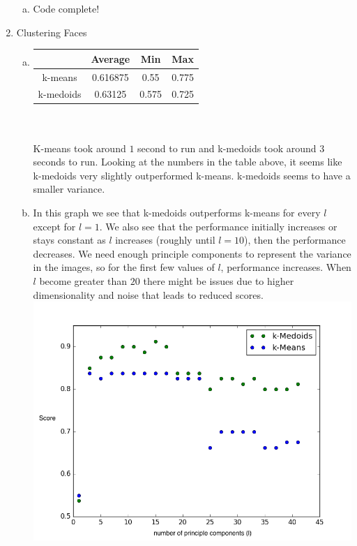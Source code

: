 \documentclass[11pt]{article}
\begin{document}
\begin{enumerate}[1]
\begin{enumerate}[(a)]
\item Code complete!
\end{enumerate}
\item Clustering Faces
\begin{enumerate}[(a)]
\item \begin{tabular}{| c | c | c | c |}
  \hline		
   & Average & Min & Max \\
  \hline
  k-means & 0.616875 & 0.55 & 0.775 \\
  k-medoids & 0.63125 & 0.575 & 0.725   \\
  \hline
\end{tabular}\\ \\
K-means took around $1$ second to run and k-medoids took around $3$ seconds to run. Looking at the numbers in the table above, it seems like k-medoids very slightly outperformed k-means. k-medoids seems to have a smaller variance. 
\item In this graph we see that k-medoids outperforms k-means for every $l$ except for $l=1$. We also see that the performance initially increases or stays constant as $l$ increases (roughly until $l=10$), then the performance decreases. We need enough principle components to represent the variance in the images, so for the first few values of $l$, performance increases. When $l$ become greater than $20$ there might be issues due to higher dimensionality and noise that leads to reduced scores.  \\
\includegraphics[scale=0.7]{figure_1}

\end{enumerate}
\end{enumerate}
\end{document}
